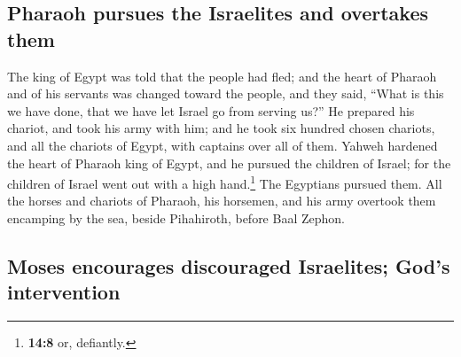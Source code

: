 \hypertarget{pharaoh-pursues-the-israelites-and-overtakes-them}{%
\subsection{Pharaoh pursues the Israelites and overtakes
them}\label{pharaoh-pursues-the-israelites-and-overtakes-them}}

 The king of Egypt was told that the people had fled; and
the heart of Pharaoh and of his servants was changed toward the people,
and they said, ``What is this we have done, that we have let Israel go
from serving us?''  He prepared his chariot, and took his
army with him;  and he took six hundred chosen chariots,
and all the chariots of Egypt, with captains over all of them.
 Yahweh hardened the heart of Pharaoh king of Egypt, and
he pursued the children of Israel; for the children of Israel went out
with a high hand.\footnote{\textbf{14:8} or, defiantly.} 
The Egyptians pursued them. All the horses and chariots of Pharaoh, his
horsemen, and his army overtook them encamping by the sea, beside
Pihahiroth, before Baal Zephon.

\hypertarget{moses-encourages-discouraged-israelites-gods-intervention}{%
\subsection{Moses encourages discouraged Israelites; God's
intervention}\label{moses-encourages-discouraged-israelites-gods-intervention}}

